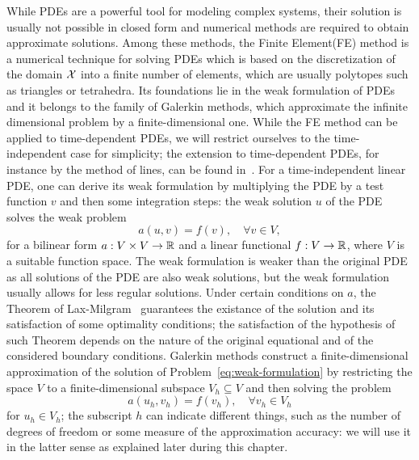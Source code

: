 While PDEs are a powerful tool for modeling complex systems, their solution is usually not possible in closed form and numerical methods are required to obtain approximate solutions.
Among these methods, the Finite Element(FE) method is a numerical technique for solving PDEs which is based on the discretization of the domain $\mathcal X$ into a finite number of elements, which are usually polytopes such as triangles or tetrahedra.
Its foundations lie in the weak formulation of PDEs and it belongs to the family of Galerkin methods, which approximate the infinite dimensional problem by a finite-dimensional one.
While the FE method can be applied to time-dependent PDEs, we will restrict ourselves to the time-independent case for simplicity; the extension to time-dependent PDEs, for instance by the method of lines, can be found in~\cite[Chapter 9]{DeuflhardWeiser2012}. \newline
For a time-independent linear PDE, one can derive its weak formulation by multiplying the PDE by a test function $v$ and then some integration steps: the weak solution $u$ of the PDE solves the weak problem 
\begin{equation}\label{eq:weak-formulation}
    a(u,v) = f(v), \quad \forall v \in V,
\end{equation}
for a bilinear form $a: V \times V \rightarrow \mathbb{R}$ and a linear functional $f: V \rightarrow \mathbb{R}$, where $V$ is a suitable function space.
The weak formulation is weaker than the original PDE as all solutions of the PDE are also weak solutions, but the weak formulation usually allows for less regular solutions.
Under certain conditions on $a$, the Theorem of Lax-Milgram~\cite{LaxMilgram1955} guarantees the existance of the solution and its satisfaction of some optimality conditions; the satisfaction of the hypothesis of such Theorem depends on the nature of the original equational and of the considered boundary conditions. \newline
Galerkin methods construct a finite-dimensional approximation of the solution of Problem~\eqref{eq:weak-formulation} by restricting the space $V$ to a finite-dimensional subspace $V_h \subseteq V$ and then solving the problem
\begin{equation*}
    a(u_h,v_h) = f(v_h), \quad \forall v_h \in V_h
\end{equation*} 
for $u_h \in V_h$; the subscript $h$ can indicate different things, such as the number of degrees of freedom or some measure of the approximation accuracy: we will use it in the latter sense as explained later during this chapter.
